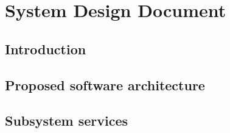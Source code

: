 


	\part*{System Design Document}

	
	\newpage
	
	\setcounter{secnumdepth}{2} %
	\tableofcontents* %
	\newpage

	\chapter{Introduction}
	
	\newpage


	\chapter{Proposed software architecture}
	

	\chapter{Subsystem services}
	



